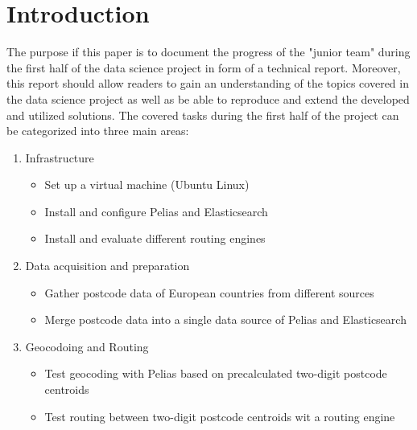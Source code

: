 
\section{Introduction}
The purpose if this paper is to document the progress of the "junior team" during the first half of the data science project in form of a technical report. Moreover, this report should allow readers to gain an understanding of the topics covered in the data science project as well as be able to reproduce and extend the developed and utilized solutions.
The covered tasks during the first half of the project can be categorized into three main areas:
\begin{enumerate}
\item Infrastructure
\begin{itemize}
\item Set up a virtual machine (Ubuntu Linux)
\item Install and configure Pelias and Elasticsearch
\item Install and evaluate different routing engines
\end{itemize}
\item Data acquisition and preparation
\begin{itemize}
\item Gather postcode data of European countries from different sources
\item Merge postcode data into a single data source of Pelias and Elasticsearch
\end{itemize}
\item Geocodoing and Routing
\begin{itemize}
\item Test geocoding with Pelias based on precalculated two-digit postcode centroids
\item Test routing between two-digit postcode centroids wit a routing engine
\end{itemize}
\end{enumerate}
